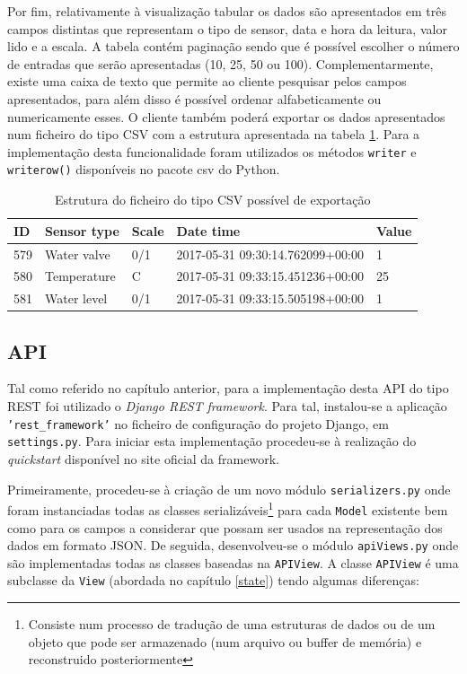 Por fim, relativamente à visualização tabular os dados são apresentados em três campos distintas que representam o tipo de sensor, data e hora da leitura, valor lido e a escala. A tabela contém paginação sendo que é possível escolher o número de entradas que serão apresentadas (10, 25, 50 ou 100). Complementarmente, existe uma caixa de texto que permite ao cliente pesquisar pelos campos apresentados, para além disso é possível ordenar alfabeticamente ou numericamente esses. O cliente também poderá exportar os dados apresentados num ficheiro do tipo \ac{CSV} com a estrutura apresentada na tabela \ref{exportcsv}. Para a implementação desta funcionalidade foram utilizados os métodos \texttt{writer} e \texttt{writerow()} disponíveis no pacote csv do Python.  

\newpage

\begin{table}[h]
	\centering

	\begin{tabular}{|l|l|l|l|l|}
		\hline
		ID & Sensor type & Scale & Date time & Value \\ \hline
		579 & Water valve & 0/1 & 2017-05-31 09:30:14.762099+00:00 & 1 \\ \hline
		580 & Temperature & C & 2017-05-31 09:33:15.451236+00:00 & 25 \\ \hline
		581 & Water level & 0/1 & 2017-05-31 09:33:15.505198+00:00 & 1 \\ \hline
	\end{tabular}
	\caption{Estrutura do ficheiro do tipo \ac{CSV} possível de exportação}
	\label{exportcsv}
\end{table}




\subsection{\ac{API}}


Tal como referido no capítulo anterior, para a implementação desta API do tipo REST foi utilizado o \textit{Django REST framework}. Para tal, instalou-se a aplicação \texttt{'rest\_framework'} no ficheiro de configuração do projeto Django, em \texttt{settings.py}. Para iniciar esta implementação procedeu-se à realização do \textit{quickstart} disponível no site oficial da framework. 

Primeiramente, procedeu-se à criação de um novo módulo \texttt{serializers.py} onde foram instanciadas todas as classes serializáveis\footnote{Consiste num processo de tradução de uma estruturas de dados ou de um objeto que pode ser armazenado (num arquivo ou buffer de memória) e reconstruido posteriormente  } para cada \texttt{Model} existente bem como  para os campos a considerar que possam ser usados na representação dos dados em formato \ac{JSON}. De seguida, desenvolveu-se o módulo \texttt{apiViews.py} onde são implementadas todas as classes baseadas na \texttt{APIView}. A classe \texttt{APIView} é uma subclasse da \texttt{View} (abordada no capítulo \ref{state}) tendo algumas diferenças: 

